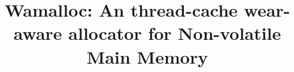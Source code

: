 \documentclass{vldb}
\begin{document}

\title{Wamalloc: An thread-cache wear-aware allocator for Non-volatile Main Memory}



%
%
%
%

\end{document}

